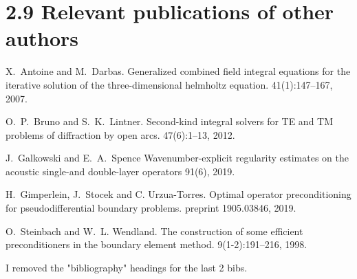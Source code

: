 \documentclass[]{report}
\newcommand{\ma}[1]{{\color{green}#1}}
\begin{document}
\section*{2.9 Relevant publications of other authors}


\begin{thebibliography}{}
	
	X.~Antoine and M.~Darbas.
	\newblock Generalized combined field integral equations for the iterative
	solution of the three-dimensional helmholtz equation.
	41(1):147--167, 2007.
	
	O.~P.~Bruno and S.~K.~Lintner.
	\newblock Second-kind integral solvers for TE and TM problems of diffraction by open arcs.
	 47(6):1--13, 2012.
	
	J.~Galkowski and E.~A.~Spence
	\newblock Wavenumber-explicit regularity estimates on the acoustic single-and double-layer operators
	 91(6), 2019.
	
	H.~Gimperlein, J.~Stocek and C. Urzua-Torres.
	\newblock Optimal operator preconditioning for pseudodifferential boundary problems.
	 preprint 1905.03846, 2019.
	
	O.~Steinbach and W.~L. Wendland.
	\newblock The construction of some efficient preconditioners in the boundary
	element method.
	 9(1-2):191--216, 1998.	
\end{thebibliography}

\ma{I removed the "bibliography" headings for the last 2 bibs. }


\egroup
\end{document}
